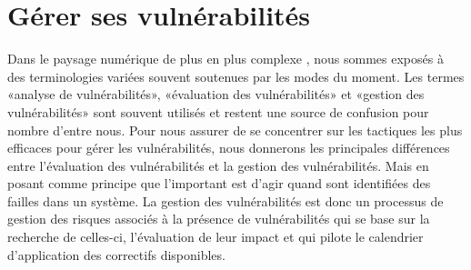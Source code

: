 \uchap{\jobname}

\section{Gérer ses vulnérabilités}
\label{CHAP_GESTVUL}

Dans le paysage numérique de plus en plus complexe , nous sommes exposés à des terminologies variées souvent soutenues par les modes du moment. Les termes «analyse de vulnérabilités», «évaluation des vulnérabilités» et «gestion des vulnérabilités» sont souvent utilisés et restent une source de confusion pour nombre d’entre nous. Pour nous assurer de se concentrer sur les tactiques les plus efficaces pour gérer les vulnérabilités, nous donnerons les principales différences entre l’évaluation des vulnérabilités et la gestion des vulnérabilités. Mais en posant comme principe que l'important est d'agir quand sont identifiées des failles dans un système.
 La gestion des vulnérabilités est donc un processus de gestion des risques associés à la présence de vulnérabilités qui se base sur la recherche de celles-ci, l'évaluation de leur impact et qui pilote le calendrier d’application des correctifs disponibles.

